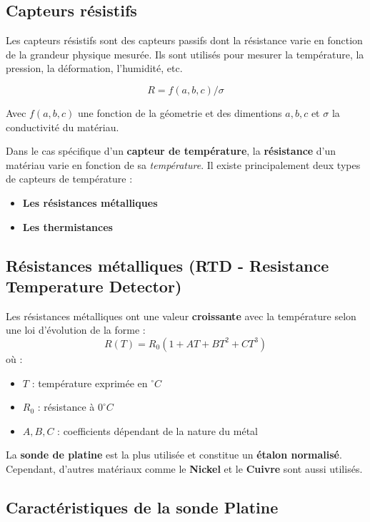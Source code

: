 \subsection*{Capteurs résistifs}
Les capteurs résistifs sont des capteurs passifs dont la résistance varie en
fonction de la grandeur physique mesurée. Ils sont utilisés pour mesurer la
température, la pression, la déformation, l'humidité, etc.

\[
    R = f(a,b,c)/\sigma
\]

Avec \(f(a,b,c)\) une fonction de la g\'eometrie et des dimentions \(a,b,c\) et 
\(\sigma\) la conductivit\'e du mat\'eriau.

Dans le cas spécifique d'un \textbf{capteur de température}, la 
\textbf{résistance} d'un matériau varie en fonction de sa \textit{température}.  
Il existe principalement deux types de capteurs de température :
\begin{itemize}
    \item \textbf{Les résistances métalliques}
    \item \textbf{Les thermistances}
\end{itemize}

\subsection*{Résistances métalliques (RTD - Resistance Temperature Detector)}

Les résistances métalliques ont une valeur \textbf{croissante} avec la 
température selon une loi d'évolution de la forme :
\begin{equation}
    R(T) = R_0 (1 + A T + B T^2 + C T^3)
\end{equation}
où :
\begin{itemize}
    \item \( T \) : température exprimée en \(^\circ C\)
    \item \( R_0 \) : résistance à \( 0^\circ C \)
    \item \( A, B, C \) : coefficients dépendant de la nature du métal
\end{itemize}

La \textbf{sonde de platine} est la plus utilisée et constitue un 
\textbf{étalon normalisé}. Cependant, d'autres matériaux comme le \textbf{Nickel} 
et le \textbf{Cuivre} sont aussi utilisés.

\subsection*{Caractéristiques de la sonde Platine}

